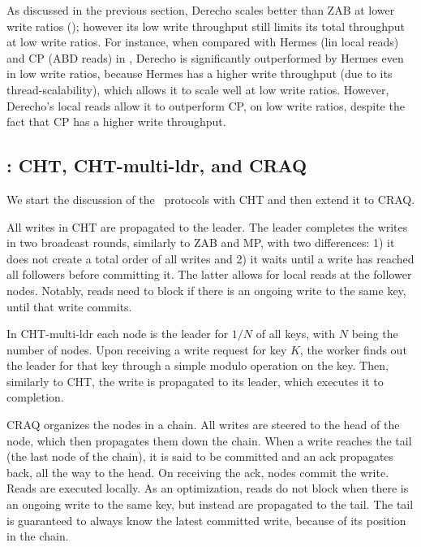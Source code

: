As discussed in the previous section, Derecho scales better than ZAB at lower write ratios (); however its low write throughput still limits its total throughput at low write ratios.
For instance, when compared with Hermes (lin local reads) and CP (ABD reads) in , Derecho is significantly outperformed by Hermes even in low write ratios, because Hermes has a higher write throughput (due to its thread-scalability), which allows it to scale well at low write ratios. 
However, Derecho's local reads allow it to outperform CP, on low write ratios, despite the fact that CP has a higher write throughput.



\subsection{\LPKO: CHT, CHT-multi-ldr, and CRAQ}\label{sec:ev:lpko}

We start the discussion of the \LPKO~protocols with CHT and then extend it to CRAQ. 


All writes in CHT are propagated to the leader. The leader completes the writes in two broadcast rounds, similarly to ZAB and MP, with two differences: 1) it does not create a total order of all writes and 2) it waits until a write has reached all followers before committing it. 
The latter allows for local reads at the follower nodes. Notably, reads need to block if there is an ongoing write to the same key, until that write commits. %



In CHT-multi-ldr each node is the leader for $1/N$ of all keys, with $N$ being the number of nodes. 
Upon receiving a write request for key $K$, the worker finds out the leader for that key through a simple modulo operation on the key. Then, similarly to CHT, the write is propagated to its leader, which executes it to completion. %


CRAQ organizes the nodes in a chain. All writes are steered to the head of the node, which then propagates them down the chain. When a write reaches the tail (\ie the last node of the chain), it is said to be committed and an ack propagates back, all the way to the head. On receiving the ack, nodes commit the write.
Reads are executed locally. As an optimization, reads do not block when there is an ongoing write to the same key, but instead are propagated to the tail. The tail is guaranteed to always know the latest committed write, because of its position in the chain. 



